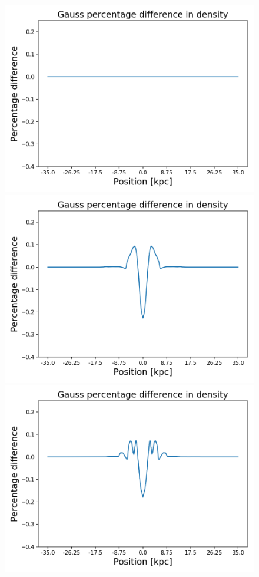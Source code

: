 \begin{figure}[h!]
    \centering
    \includegraphics[scale=0.45]{imag/cGaussD0.png}
    \includegraphics[scale=0.45]{imag/cGaussD14.png}
    \includegraphics[scale=0.45]{imag/cGaussD30.png}

\end{figure}
